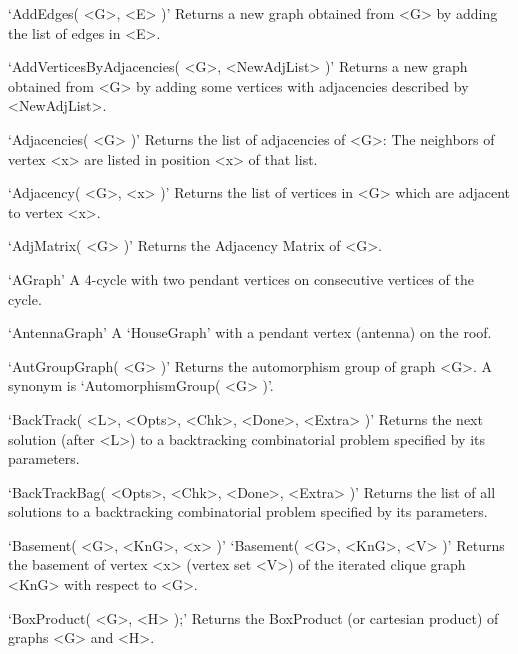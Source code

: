 `AddEdges( <G>, <E> )'\newline\hglue 5mm 
Returns a new graph obtained from <G> by adding the list of edges in <E>.

`AddVerticesByAdjacencies( <G>, <NewAdjList> )'\newline\hglue 5mm 
Returns a new graph obtained from <G> by adding some vertices with adjacencies described by <NewAdjList>.

`Adjacencies( <G> )'\newline\hglue 5mm 
Returns the list of adjacencies of <G>: The neighbors of vertex <x> are listed in position <x> of that list.

`Adjacency( <G>, <x> )'\newline\hglue 5mm 
Returns the list of vertices in <G> which are adjacent to vertex <x>.

`AdjMatrix( <G> )'\newline\hglue 5mm 
Returns the Adjacency Matrix of <G>.

`AGraph'\newline\hglue 5mm 
A 4-cycle with two pendant vertices on consecutive vertices of the cycle.

`AntennaGraph'\newline\hglue 5mm 
A `HouseGraph' with a pendant vertex (antenna) on the roof.

`AutGroupGraph( <G> )'\newline\hglue 5mm 
Returns the automorphism group of graph <G>. A synonym is `AutomorphismGroup( <G> )'.

`BackTrack( <L>, <Opts>, <Chk>, <Done>, <Extra> )'\newline\hglue 5mm 
Returns the next solution (after <L>) to a backtracking combinatorial problem specified by its parameters.

`BackTrackBag( <Opts>, <Chk>, <Done>, <Extra> )'\newline\hglue 5mm 
Returns the list of all solutions to a backtracking combinatorial problem specified by its parameters.

`Basement( <G>, <KnG>, <x> )'\newline
`Basement( <G>, <KnG>, <V> )'\newline\hglue 5mm 
Returns the basement of vertex <x> (vertex set <V>) of the iterated clique graph <KnG> with respect to <G>.

`BoxProduct( <G>, <H> );'\newline\hglue 5mm 
Returns the BoxProduct (or cartesian product) of graphs <G> and <H>.

